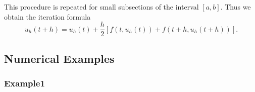 	\begin{frame}
		This procedure is repeated for small subsections of the interval $[a,b]$. Thus we obtain the iteration formula
		\begin{displaymath}
			u_h (t+h) = u_h(t) +\frac{h}{2}[f(t,u_h(t)) + f(t+h, u_h(t+h))].
		\end{displaymath}
	\end{frame}
	
	\subsection*{Numerical Examples}
	
	\subsubsection{Example1}
	
